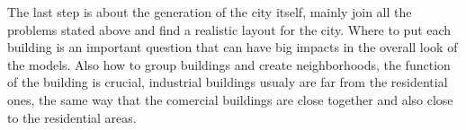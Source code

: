 The last step is about the generation of the city itself, mainly join all the problems stated above and find a realistic layout for the city. Where to put each building is an important question that can have big impacts in the overall look of the models. Also how to group buildings and create neighborhoods, the function of the building is crucial, industrial buildings usualy are far from the residential ones, the same way that the comercial buildings are close together and also close to the residential areas.















%


